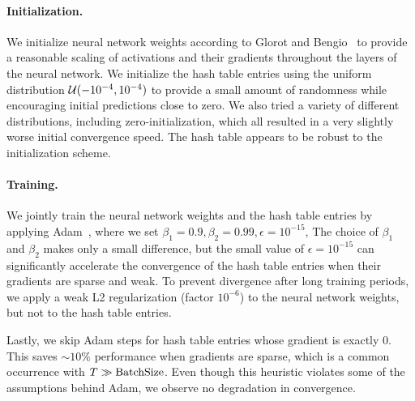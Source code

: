 \documentclass[acmtog,authorversion]{acmart}
\begin{document}
\paragraph{Initialization.}
We initialize neural network weights according to Glorot and Bengio~ to provide a reasonable scaling of activations and their gradients throughout the layers of the neural network.
We initialize the hash table entries using the uniform distribution ${\mathcal{U}}(-10^{-4}, 10^{-4})$ to provide a small amount of randomness while encouraging initial predictions close to zero.
We also tried a variety of different distributions, including zero-initialization, which all resulted in a very slightly worse initial convergence speed.
The hash table appears to be robust to the initialization scheme.

\paragraph{Training.}
We jointly train the neural network weights and the hash table entries by applying Adam~\cite{KingmaB14}, where we set ${\beta_1 = 0.9, \beta_2 = 0.99, \epsilon=10^{-15}}$, 
The choice of $\beta_1$ and $\beta_2$ makes only a small difference, but the small value of $\epsilon=10^{-15}$ can significantly accelerate the convergence of the hash table entries when their gradients are sparse and weak.
To prevent divergence after long training periods, we apply a weak L2 regularization (factor $10^{-6}$) to the neural network weights, but not to the hash table entries.



Lastly, we skip Adam steps for hash table entries whose gradient is exactly $0$.
This saves ${\sim\!10\%}$ performance when gradients are sparse, which is a common occurrence with ${T \gg \mathrm{BatchSize}}$.
Even though this heuristic violates some of the assumptions behind Adam, we observe no degradation in convergence.
\end{document}
